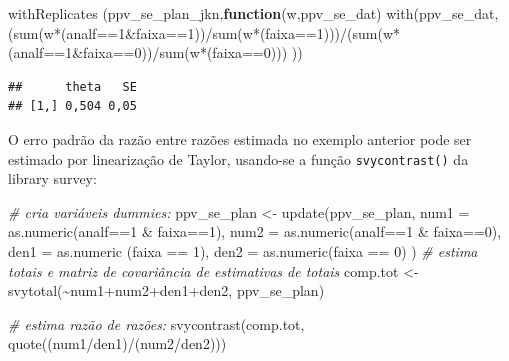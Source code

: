 \documentclass[
  12pt,
  brazilian,
]{book}
\newenvironment{Shaded}{\begin{snugshade}}{\end{snugshade}}
\newcommand{\AttributeTok}[1]{\textcolor[rgb]{0.77,0.63,0.00}{#1}}
\newcommand{\CommentTok}[1]{\textcolor[rgb]{0.56,0.35,0.01}{\textit{#1}}}
\newcommand{\ControlFlowTok}[1]{\textcolor[rgb]{0.13,0.29,0.53}{\textbf{#1}}}
\newcommand{\DecValTok}[1]{\textcolor[rgb]{0.00,0.00,0.81}{#1}}
\newcommand{\FunctionTok}[1]{\textcolor[rgb]{0.00,0.00,0.00}{#1}}
\newcommand{\NormalTok}[1]{#1}
\newcommand{\OtherTok}[1]{\textcolor[rgb]{0.56,0.35,0.01}{#1}}
\newcommand{\SpecialCharTok}[1]{\textcolor[rgb]{0.00,0.00,0.00}{#1}}
\theoremstyle{definition}
\theoremstyle{definition}
\theoremstyle{definition}
\theoremstyle{definition}
\theoremstyle{remark}
\begin{document}
\begin{Shaded}
\begin{Highlighting}[]
\FunctionTok{withReplicates}\NormalTok{ (ppv\_se\_plan\_jkn,}\ControlFlowTok{function}\NormalTok{(w,ppv\_se\_dat) }\FunctionTok{with}\NormalTok{(ppv\_se\_dat,}
\NormalTok{(}\FunctionTok{sum}\NormalTok{(w}\SpecialCharTok{*}\NormalTok{(analf}\SpecialCharTok{==}\DecValTok{1}\SpecialCharTok{\&}\NormalTok{faixa}\SpecialCharTok{==}\DecValTok{1}\NormalTok{))}\SpecialCharTok{/}\FunctionTok{sum}\NormalTok{(w}\SpecialCharTok{*}\NormalTok{(faixa}\SpecialCharTok{==}\DecValTok{1}\NormalTok{)))}\SpecialCharTok{/}\NormalTok{(}\FunctionTok{sum}\NormalTok{(w}\SpecialCharTok{*}\NormalTok{(analf}\SpecialCharTok{==}\DecValTok{1}\SpecialCharTok{\&}\NormalTok{faixa}\SpecialCharTok{==}\DecValTok{0}\NormalTok{))}\SpecialCharTok{/}\FunctionTok{sum}\NormalTok{(w}\SpecialCharTok{*}\NormalTok{(faixa}\SpecialCharTok{==}\DecValTok{0}\NormalTok{)))}
\NormalTok{))  }
\end{Highlighting}
\end{Shaded}

\begin{verbatim}
##      theta   SE
## [1,] 0,504 0,05
\end{verbatim}

O erro padrão da razão entre razões estimada no exemplo anterior pode ser estimado por linearização de Taylor, usando-se a função \texttt{svycontrast()} da library survey:

\begin{Shaded}
\begin{Highlighting}[]
\CommentTok{\# cria variáveis dummies: }
\NormalTok{ppv\_se\_plan }\OtherTok{\textless{}{-}} \FunctionTok{update}\NormalTok{(ppv\_se\_plan,}
\AttributeTok{num1 =} \FunctionTok{as.numeric}\NormalTok{(analf}\SpecialCharTok{==}\DecValTok{1} \SpecialCharTok{\&}\NormalTok{ faixa}\SpecialCharTok{==}\DecValTok{1}\NormalTok{),}
\AttributeTok{num2 =} \FunctionTok{as.numeric}\NormalTok{(analf}\SpecialCharTok{==}\DecValTok{1} \SpecialCharTok{\&}\NormalTok{ faixa}\SpecialCharTok{==}\DecValTok{0}\NormalTok{),}
\AttributeTok{den1 =} \FunctionTok{as.numeric}\NormalTok{ (faixa }\SpecialCharTok{==} \DecValTok{1}\NormalTok{),}
\AttributeTok{den2 =} \FunctionTok{as.numeric}\NormalTok{(faixa }\SpecialCharTok{==} \DecValTok{0}\NormalTok{)}
\NormalTok{)}
\CommentTok{\# estima totais e matriz de covariância de estimativas de totais}
\NormalTok{comp.tot }\OtherTok{\textless{}{-}} \FunctionTok{svytotal}\NormalTok{(}\SpecialCharTok{\textasciitilde{}}\NormalTok{num1}\SpecialCharTok{+}\NormalTok{num2}\SpecialCharTok{+}\NormalTok{den1}\SpecialCharTok{+}\NormalTok{den2, ppv\_se\_plan)  }

\CommentTok{\# estima razão de razões:  }
\FunctionTok{svycontrast}\NormalTok{(comp.tot, }\FunctionTok{quote}\NormalTok{((num1}\SpecialCharTok{/}\NormalTok{den1)}\SpecialCharTok{/}\NormalTok{(num2}\SpecialCharTok{/}\NormalTok{den2)))  }
\end{Highlighting}
\end{Shaded}
\end{document}
